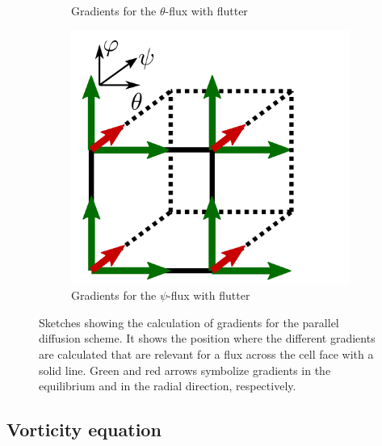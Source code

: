 \begin{figure}[H]
\begin{subfigure}[t]{0.32\textwidth}
		\caption{ Gradients for the $\theta$-flux with flutter}
		\label{fig:Gunter3D_theta} 
	\end{subfigure}
	\begin{subfigure}[t]{0.32\textwidth}
		\centering
		\includegraphics[width=\textwidth]{schemes/Gunter3D_psi.png}
		\caption{ Gradients for the $\psi$-flux with flutter}
		\label{fig:GunterD_psi}
	\end{subfigure}
	\caption[Sketches showing the calculation of gradients for the parallel diffusion scheme]{Sketches showing the calculation of gradients for the parallel diffusion scheme. It shows the position where the different gradients are calculated that are relevant for a flux across the cell face with a solid line. Green and red arrows symbolize gradients in the equilibrium and in the radial direction, respectively.}
	\label{fig:GunterStencils_flutter}
\end{figure}



\subsection{Vorticity equation}

